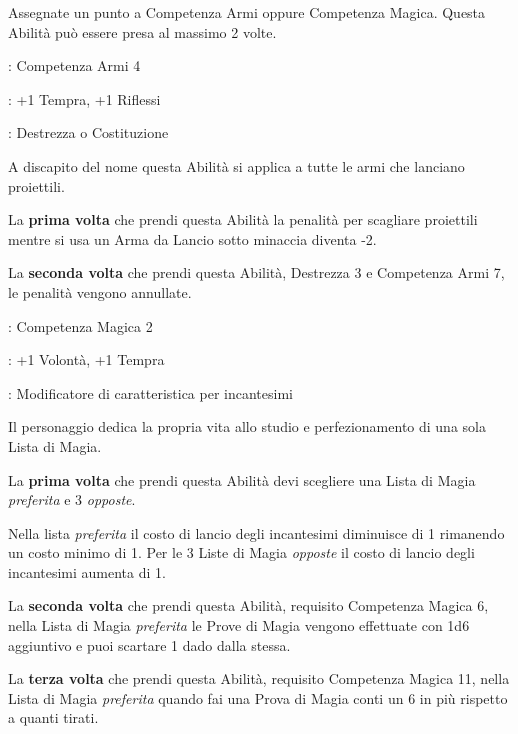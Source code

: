 \begin{multicols}{2}
Assegnate un punto a Competenza Armi oppure Competenza Magica. Questa Abilità può essere presa al massimo 2 volte.

\begin{description}[noitemsep, topsep=0pt, parsep=0pt, partopsep=0pt, leftmargin=0cm, labelwidth=2.5cm]
    \item[\textbf{Requisito}]: Competenza Armi 4
    \item[\textbf{Tiri Salvezza}]: +1 Tempra, +1 Riflessi
    \item[\textbf{Caratteristica}]: Destrezza o Costituzione
\end{description}

A discapito del nome questa Abilità si applica a tutte le armi che lanciano proiettili.

La \textbf{prima volta} che prendi questa Abilità la penalità per scagliare proiettili mentre si usa un Arma da Lancio sotto minaccia diventa -2.

La \textbf{seconda volta} che prendi questa Abilità, Destrezza 3 e Competenza Armi 7, le penalità vengono annullate.

\begin{description}[noitemsep, topsep=0pt, parsep=0pt, partopsep=0pt, leftmargin=0cm, labelwidth=2.5cm]
    \item[\textbf{Requisito}]: Competenza Magica 2
    \item[\textbf{Tiri Salvezza}]: +1 Volontà, +1 Tempra
    \item[\textbf{Caratteristica}]: Modificatore di caratteristica per incantesimi
\end{description}

Il personaggio dedica la propria vita allo studio e perfezionamento di una sola Lista di Magia.

La \textbf{prima volta} che prendi questa Abilità devi scegliere una Lista di Magia \emph{preferita} e 3 \emph{opposte}.

Nella lista \emph{preferita} il costo di lancio degli incantesimi diminuisce di 1 rimanendo un costo minimo di 1. Per le 3 Liste di Magia \emph{opposte} il costo di lancio degli incantesimi aumenta di 1.

La \textbf{seconda volta} che prendi questa Abilità, requisito Competenza Magica 6, nella Lista di Magia \emph{preferita} le Prove di Magia vengono effettuate con 1d6 aggiuntivo e puoi scartare 1 dado dalla stessa.

La \textbf{terza volta} che prendi questa Abilità, requisito Competenza Magica 11, nella Lista di Magia \emph{preferita} quando fai una Prova di Magia conti un 6 in più rispetto a quanti tirati.


\end{multicols}

